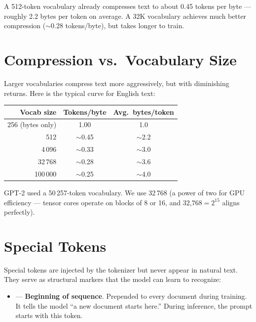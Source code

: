 A 512-token vocabulary already compresses text to about 0.45 tokens per byte --- roughly 2.2 bytes per token on average.  A 32K vocabulary achieves much better compression ($\sim$0.28 tokens/byte), but takes longer to train.


\section{Compression vs.\ Vocabulary Size}

Larger vocabularies compress text more aggressively, but with diminishing returns.  Here is the typical curve for English text:

\begin{center}
\begin{tabular}{rcc}
\toprule
Vocab size & Tokens/byte & Avg.\ bytes/token \\
\midrule
256 (bytes only) & 1.00 & 1.0 \\
512 & $\sim$0.45 & $\sim$2.2 \\
4\,096 & $\sim$0.33 & $\sim$3.0 \\
32\,768 & $\sim$0.28 & $\sim$3.6 \\
100\,000 & $\sim$0.25 & $\sim$4.0 \\
\bottomrule
\end{tabular}
\end{center}

GPT-2 used a 50\,257-token vocabulary.  We use 32\,768 (a power of two for GPU efficiency --- tensor cores operate on blocks of 8 or 16, and $32\text{,}768 = 2^{15}$ aligns perfectly).



\section{Special Tokens}

Special tokens are injected by the tokenizer but never appear in natural text.  They serve as structural markers that the model can learn to recognize:

\begin{itemize}
  \item {} --- \textbf{Beginning of sequence}.  Prepended to every document during training.  It tells the model ``a new document starts here.''  During inference, the prompt starts with this token.
\end{itemize}

